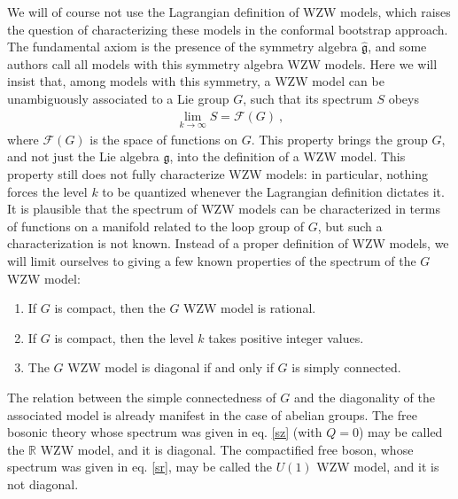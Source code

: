 \documentclass[12pt, a4paper, notitlepage, twoside]{report}
\numberwithin{equation}{section}
\theoremstyle{break}
\begin{document}
We will of course not use the Lagrangian definition of WZW models, which raises the question of characterizing these models in the conformal bootstrap approach.
The fundamental axiom is the presence of the symmetry algebra $\hat{\mathfrak{g}}$, and some  authors call all models with this symmetry algebra WZW models.
Here we will insist that, among models with this symmetry, 
a WZW model can be unambiguously associated to a Lie group $G$, such that its spectrum $S$ obeys
\begin{align}
 \boxed{\underset{k\to \infty}{\lim} S = \mathcal{F}(G)}\ ,
\label{lsfg}
\end{align}
where $\mathcal{F}(G)$ is the space of functions on $G$.
This property brings the group $G$, and not just the Lie algebra $\mathfrak{g}$, into the definition of a WZW model.
This property still does not fully characterize WZW models: in particular, nothing forces the level $k$ to be quantized whenever the Lagrangian definition dictates it.
It is plausible that the spectrum of WZW models can be characterized in terms of functions on a manifold related to the loop group of $G$, but such a characterization is not known.
Instead of a proper definition of WZW models, we will limit ourselves to giving a few known properties of the spectrum of the $G$ WZW model:
\begin{enumerate}
 \item If $G$ is compact, then the $G$ WZW model is rational.
\item If $G$ is compact, then the level $k$ takes positive integer values.
\item The $G$ WZW model is diagonal if and only if $G$ is simply connected. 
\end{enumerate}
The relation between the simple connectedness of $G$ and the diagonality of the associated model is already manifest in the case of abelian groups.
The free bosonic theory whose spectrum was given in eq. \eqref{sz} (with $Q=0$) may be called the ${\mathbb{R}}$ WZW model, and it is diagonal.
The compactified free boson, whose spectrum was given in eq. \eqref{sr}, may be called the $U(1)$ WZW model, and it is not diagonal. 
\end{document}
